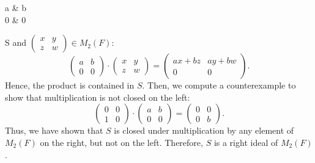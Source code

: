 \documentclass[12pt, oneside]{book}
\begin{document}
\begin{enumerate}
{\begin{pmatrix}
			a & b \\
			0 & 0 
		\end{pmatrix} \in S\) and \(\begin{pmatrix} x & y \\ z & w \end{pmatrix} \in M_{2}(F)\):
		\[
			\begin{pmatrix}
				a & b \\
				0 & 0
			\end{pmatrix} \cdot \begin{pmatrix}
				x & y \\
				z & w
			\end{pmatrix} = \begin{pmatrix}
				ax + bz & ay + bw \\
				0 & 0
			\end{pmatrix}.
		\]
		Hence, the product is contained in \(S\). Then, we compute a counterexample to show that multiplication is not closed on the left:
		\[
			\begin{pmatrix}
				0 & 0 \\
				1 & 0
			\end{pmatrix} \cdot \begin{pmatrix}
				a & b \\
				0 & 0
			\end{pmatrix} = \begin{pmatrix}
				0 & 0 \\
				0 & b
			\end{pmatrix}.
		\]
		Thus, we have shown that \(S\) is closed under multiplication by any element of \(M_{2}(F)\) on the right, but not on the left. Therefore, \(S\) is a right ideal of \(M_{2}(F)\).  
	}
\end{enumerate}

\end{document}
